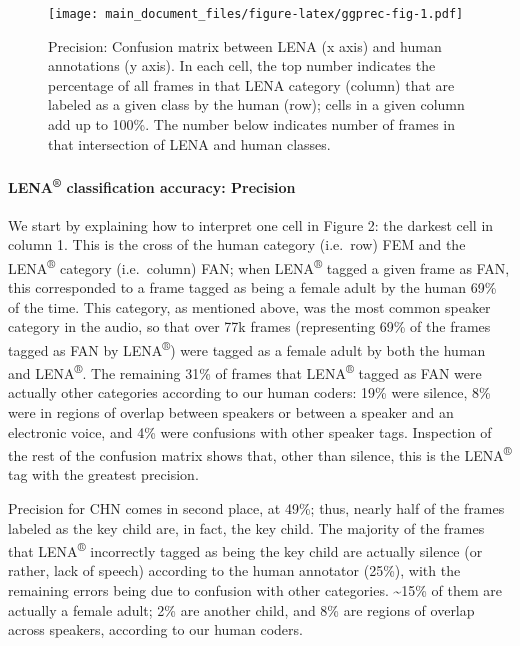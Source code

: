 \documentclass[english,floatsintext,man]{apa6}
\begin{document}
\begin{figure}
\centering
\texttt{[image: main\_document\_files/figure-latex/ggprec-fig-1.pdf]}
\caption{\label{fig:ggprec-fig}Precision: Confusion matrix between LENA (x
axis) and human annotations (y axis). In each cell, the top number
indicates the percentage of all frames in that LENA category (column)
that are labeled as a given class by the human (row); cells in a given
column add up to 100\%. The number below indicates number of frames in
that intersection of LENA and human classes.}
\end{figure}

\paragraph{\texorpdfstring{LENA\textsuperscript{®} classification
accuracy:
Precision}{LENA® classification accuracy: Precision}}\label{lena-classification-accuracy-precision}

We start by explaining how to interpret one cell in Figure 2: the
darkest cell in column 1. This is the cross of the human category
(i.e.~row) FEM and the LENA\textsuperscript{®} category (i.e.~column)
FAN; when LENA\textsuperscript{®} tagged a given frame as FAN, this
corresponded to a frame tagged as being a female adult by the human 69\%
of the time. This category, as mentioned above, was the most common
speaker category in the audio, so that over 77k frames (representing
69\% of the frames tagged as FAN by LENA\textsuperscript{®}) were tagged
as a female adult by both the human and LENA\textsuperscript{®}. The
remaining 31\% of frames that LENA\textsuperscript{®} tagged as FAN were
actually other categories according to our human coders: 19\% were
silence, 8\% were in regions of overlap between speakers or between a
speaker and an electronic voice, and 4\% were confusions with other
speaker tags. Inspection of the rest of the confusion matrix shows that,
other than silence, this is the LENA\textsuperscript{®} tag with the
greatest precision.

Precision for CHN comes in second place, at 49\%; thus, nearly half of
the frames labeled as the key child are, in fact, the key child. The
majority of the frames that LENA\textsuperscript{®} incorrectly tagged
as being the key child are actually silence (or rather, lack of speech)
according to the human annotator (25\%), with the remaining errors being
due to confusion with other categories. \textasciitilde{}15\% of them
are actually a female adult; 2\% are another child, and 8\% are regions
of overlap across speakers, according to our human coders.
\end{document}
